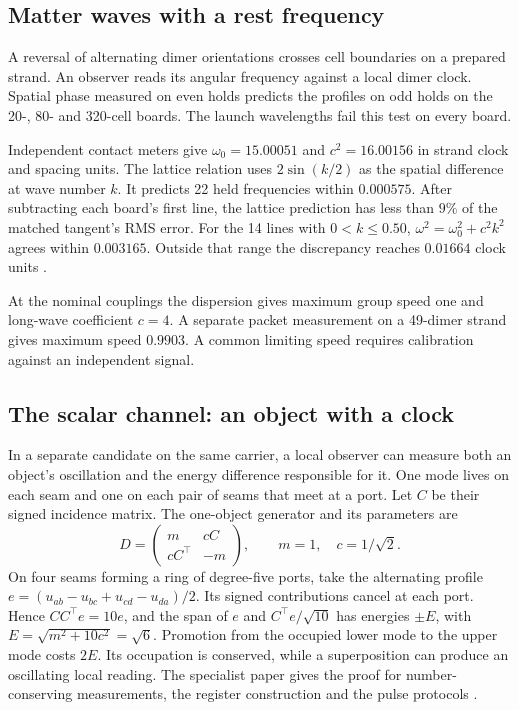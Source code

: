 \documentclass[11pt]{article}
\theoremstyle{definition}
\theoremstyle{remark}
\begin{document}
\subsection{Matter waves with a rest frequency}
\label{sec:matter-waves}

A reversal of alternating dimer orientations crosses cell boundaries
on a prepared strand. An observer reads its angular frequency against a
local dimer clock. Spatial phase measured on even holds predicts the
profiles on odd holds on the 20-, 80- and 320-cell boards. The launch
wavelengths fail this test on every board.

Independent contact meters give \(\omega_0=15.00051\) and
\(c^2=16.00156\) in strand clock and spacing units. The lattice
relation uses \(2\sin(k/2)\) as the spatial difference at wave number
\(k\). It predicts 22 held frequencies within \(0.000575\). After
subtracting each board's first line, the lattice prediction has less
than \(9\%\) of the matched tangent's RMS error. For the
14 lines with \(0<k\leq0.50\), \(\omega^2=\omega_0^2+c^2 k^2\) agrees
within \(0.003165\). Outside that range the discrepancy reaches
\(0.01664\) clock units \cite{ophspine,ophmodel}.

At the nominal couplings the dispersion gives maximum group speed one
and long-wave coefficient \(c=4\). A separate packet measurement on a
49-dimer strand gives maximum speed \(0.9903\). A common limiting
speed requires calibration against an independent signal.

\subsection{The scalar channel: an object with a clock}
\label{sec:cage}

In a separate candidate on the same carrier, a local observer can measure
both an object's oscillation and the energy difference responsible for it.
One mode lives on each seam and one on each pair of seams that meet at a
port. Let $C$ be their signed incidence matrix. The one-object generator
and its parameters are
\begin{equation}
 D=\begin{pmatrix}m&cC\\ cC^{\top}&-m\end{pmatrix},
 \qquad m=1,\quad c=1/\sqrt{2}.
 \label{eq:scalar}
\end{equation}
On four seams forming a ring of degree-five ports, take the alternating
profile $e=(u_{ab}-u_{bc}+u_{cd}-u_{da})/2$. Its signed contributions
cancel at each port. Hence $CC^{\top}e=10e$, and the span of $e$ and
$C^{\top}e/\sqrt{10}$ has energies $\pm E$, with
$E=\sqrt{m^2+10c^2}=\sqrt{6}$. Promotion from the occupied lower mode
to the upper mode costs $2E$. Its occupation is conserved, while a
superposition can produce an oscillating local reading. The specialist
paper gives the proof for number-conserving measurements, the register
construction and the pulse protocols \cite{ophspine}.
\end{document}
